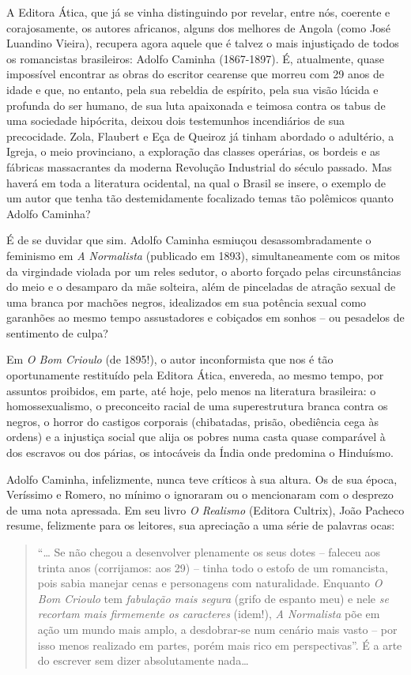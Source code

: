 \documentclass[
  letterpaper,
  DIV=11,
  numbers=noendperiod]{scrreprt}
\begin{document}
A Editora Ática, que já se vinha distinguindo por revelar, entre nós,
coerente e corajosamente, os autores africanos, alguns dos melhores de
Angola (como José Luandino Vieira), recupera agora aquele que é talvez o
mais injustiçado de todos os romancistas brasileiros: Adolfo Caminha
(1867-1897). É, atualmente, quase impossível encontrar as obras do
escritor cearense que morreu com 29 anos de idade e que, no entanto,
pela sua rebeldia de espírito, pela sua visão lúcida e profunda do ser
humano, de sua luta apaixonada e teimosa contra os tabus de uma
sociedade hipócrita, deixou dois testemunhos incendiários de sua
precocidade. Zola, Flaubert e Eça de Queiroz já tinham abordado o
adultério, a Igreja, o meio provinciano, a exploração das classes
operárias, os bordeis e as fábricas massacrantes da moderna Revolução
Industrial do século passado. Mas haverá em toda a literatura ocidental,
na qual o Brasil se insere, o exemplo de um autor que tenha tão
destemidamente focalizado temas tão polêmicos quanto Adolfo Caminha?

É de se duvidar que sim. Adolfo Caminha esmiuçou desassombradamente o
feminismo em \emph{A Normalista} (publicado em 1893), simultaneamente
com os mitos da virgindade violada por um reles sedutor, o aborto
forçado pelas circunstâncias do meio e o desamparo da mãe solteira, além
de pinceladas de atração sexual de uma branca por machões negros,
idealizados em sua potência sexual como garanhões ao mesmo tempo
assustadores e cobiçados em sonhos -- ou pesadelos de sentimento de
culpa?

Em \emph{O Bom Crioulo} (de 1895!), o autor inconformista que nos é tão
oportunamente restituído pela Editora Ática, envereda, ao mesmo tempo,
por assuntos proibidos, em parte, até hoje, pelo menos na literatura
brasileira: o homossexualismo, o preconceito racial de uma
superestrutura branca contra os negros, o horror do castigos corporais
(chibatadas, prisão, obediência cega às ordens) e a injustiça social que
alija os pobres numa casta quase comparável à dos escravos ou dos
párias, os intocáveis da Índia onde predomina o Hinduísmo.

Adolfo Caminha, infelizmente, nunca teve críticos à sua altura. Os de
sua época, Veríssimo e Romero, no mínimo o ignoraram ou o mencionaram
com o desprezo de uma nota apressada. Em seu livro \emph{O Realismo}
(Editora Cultrix), João Pacheco resume, felizmente para os leitores, sua
apreciação a uma série de palavras ocas:

\begin{quote}
``\ldots{} Se não chegou a desenvolver plenamente os seus dotes --
faleceu aos trinta anos (corrijamos: aos 29) -- tinha todo o estofo de
um romancista, pois sabia manejar cenas e personagens com naturalidade.
Enquanto \emph{O Bom Crioulo} tem \emph{fabulação mais segura} (grifo de
espanto meu) e nele \emph{se recortam mais firmemente os caracteres}
(idem!), \emph{A Normalista} põe em ação um mundo mais amplo, a
desdobrar-se num cenário mais vasto -- por isso menos realizado em
partes, porém mais rico em perspectivas''. É a arte do escrever sem
dizer absolutamente nada\ldots{}
\end{quote}
\end{document}
